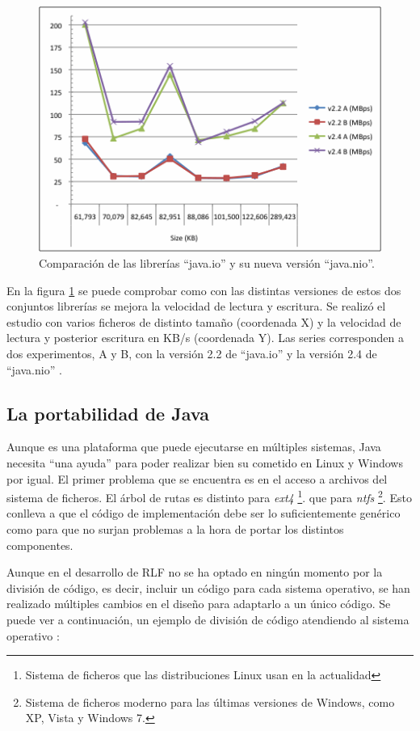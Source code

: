 \begin{figure}[h]
	\centering
	\includegraphics[scale=0.9]{images/io-vs-nio.png}
	\caption[Java.io VS Java.nio]{Comparación de las librerías 
	``java.io'' y su nueva versión ``java.nio''.}
	\label{fig:niovsio}
\end{figure}

En la figura \ref{fig:niovsio} se puede comprobar como con las 
distintas versiones de estos dos conjuntos librerías se mejora la 
velocidad de lectura y escritura. Se realizó el estudio con varios 
ficheros de distinto tamaño (coordenada X) y la velocidad de lectura y 
posterior escritura en KB/s (coordenada Y). Las series corresponden a 
dos experimentos, A y B, con la versión 2.2 de ``java.io'' y la 
versión 2.4 de ``java.nio'' \cite{Javaiovsnio}.

\subsection{La portabilidad de Java}
Aunque es una plataforma que puede ejecutarse en múltiples sistemas, 
Java necesita ``una ayuda'' para poder realizar bien su cometido en 
Linux y Windows por igual. El primer problema que se encuentra es en 
el acceso a archivos del sistema de ficheros. El árbol de rutas es 
distinto para \emph{ext4} \footnote{Sistema de ficheros que las distribuciones 
Linux usan en la actualidad}. que para \emph{ntfs} \footnote{Sistema 
de ficheros moderno para las últimas versiones de Windows, como XP, 
Vista y Windows 7.}. Esto conlleva a que el código de implementación 
debe ser lo suficientemente genérico como para que no surjan problemas 
a la hora de portar los distintos componentes.

Aunque en el desarrollo de RLF no se ha optado en ningún momento por 
la división de código, es decir, incluir un código para cada 
sistema operativo, se han realizado múltiples cambios en el diseño 
para adaptarlo a un único código. Se puede ver a continuación, un 
ejemplo de división de código atendiendo al sistema operativo 
\cite{java2}:

